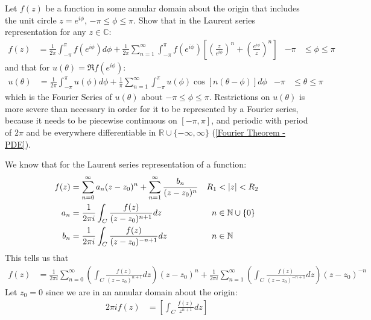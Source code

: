 \documentclass[12pt, english]{book}
\makeatletter
\renewenvironment{proof}[1][\proofname]{\par
	\pushQED{\qed}%
	\normalfont \topsep6\p@\@plus6\p@\relax
	\list{}{%
		\settowidth{\leftmargin}{\itshape\proofname:\hskip\labelsep}%
		\setlength{\labelwidth}{0pt}%
		\setlength{\itemindent}{-\leftmargin}%
	}%
	\item[\hskip\labelsep\itshape#1\@addpunct{:}]\ignorespaces
}{%
	\popQED\endlist\@endpefalse
}
\makeatother
\begin{document}
	\begin{example}
		Let \(f(z)\) be a function in some annular domain about the origin that includes the unit circle \(z = e^{i\phi}\), \(-\pi \leq \phi \leq \pi\). Show that in the Laurent series representation for any \(z \in \mathbb{C}\):
		\begin{align*}
			f(z) &= \frac{1}{2\pi} \int_{-\pi}^{\pi} f(e^{i\phi}) d \phi
				+ \frac{1}{2\pi} \sum_{n=1}^{\infty} \int_{-\pi}^{\pi} f(e^{i\phi}) \left[\left(\frac{z}{e^{i\phi}}\right)^n + \left(\frac{e^{i\phi}}{z}\right)^n\right]
				& -\pi &\leq \phi \leq \pi
		\end{align*}
		and that for \(u(\theta) = \Re{f(e^{i\phi})}\):
		\begin{align*}
			u(\theta) &= \frac{1}{2\pi} \int_{-\pi}^{\pi} u(\phi) d \phi
				+ \frac{1}{\pi} \sum_{n=1}^{\infty} \int_{-\pi}^{\pi} u(\phi) \cos[n(\theta-\phi)] d\phi
				& -\pi &\leq \theta \leq \pi
		\end{align*}
		which is the Fourier Series of \(u(\theta)\) about \(-\pi \leq \phi \leq \pi\). Restrictions on \(u(\theta)\) is more severe than necessary in order for it to be represented by a Fourier series, because it needs to be piecewise continuous on \([-\pi,\pi]\), and periodic with period of \(2\pi\) and be everywhere differentiable in \(\mathbb{R}\cup\{-\infty, \infty\}\) (\cref{Fourier Theorem - PDE}).
		\begin{proof}
			{\color{Grey}
			We know that for the Laurent series representation of a function:
			\begin{align*}
				f(z) &= \sum_{n=0}^{\infty} a_n(z-z_0)^n + \sum_{n=1}^{\infty} \frac{b_n}{(z-z_0)^n}
					& R_1 &< \abs{z} < R_2 \\
				a_n &= \frac{1}{2\pi i} \int_{C} \frac{f(z)}{(z-z_0)^{n+1}} dz
					& n &\in \mathbb{N} \cup \{0\} \\
				b_n &= \frac{1}{2\pi i} \int_{C} \frac{f(z)}{(z-z_0)^{-n+1}} dz 
					& n &\in \mathbb{N}
			\end{align*}
			This tells us that 
			\begin{align*}
				f(z) &= \frac{1}{2\pi i} \sum_{n=0}^{\infty} 
				\left( \int_{C} \frac{f(z)}{(z-z_0)^{n+1}} dz \right) (z-z_0)^n
				+ \frac{1}{2\pi i} \sum_{n=1}^{\infty} \left(\int_{C} \frac{f(z)}{(z-z_0)^{-n+1}} dz \right) (z-z_0)^{-n}
			\end{align*}
			Let \(z_0 = 0\) since we are in an annular domain about the origin:
			\begin{align*}
				2\pi i f(z) 
				&= \left[\int_{C} \frac{f(z)}{z^{n+1}} dz \right]

\end{align*}}
\end{proof}
\end{example}
\end{document}
